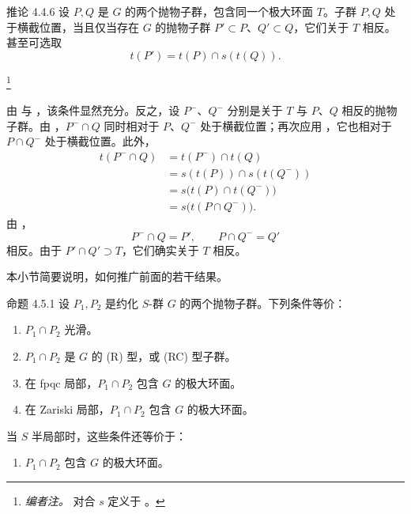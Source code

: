 \begin{sgastatement}{推论 4.4.6}
设 \(P,Q\) 是 \(G\) 的两个抛物子群，包含同一个极大环面 \(T\)。子群 \(P,Q\) 处于横截位置，当且仅当存在 \(G\) 的抛物子群 \(P'\subset P\)、\(Q'\subset Q\)，它们关于 \(T\) 相反。甚至可选取
\[
 t(P')=t(P)\cap s(t(Q)).
\]
\end{sgastatement}
\footnote{\emph{编者注。} 对合 \(s\) 定义于 。}

由 \textup{} 与 \textup{}，该条件显然充分。反之，设 \(P^-\)、\(Q^-\) 分别是关于 \(T\) 与 \(P\)、\(Q\) 相反的抛物子群。由 ，\(P^-\cap Q\) 同时相对于 \(P\)、\(Q^-\) 处于横截位置；再次应用 ，它也相对于 \(P\cap Q^-\) 处于横截位置。此外，
\[
\begin{aligned}
 t(P^-\cap Q)
 &=t(P^-)\cap t(Q)\\
 &=s(t(P))\cap s(t(Q^-))\\
 &=s\bigl(t(P)\cap t(Q^-)\bigr)\\
 &=s\bigl(t(P\cap Q^-)\bigr).
\end{aligned}
\]
由 \textup{}，
\[
 P^-\cap Q=P',\qquad P\cap Q^-=Q'
\]
相反。由于 \(P'\cap Q'\supset T\)，它们确实关于 \(T\) 相反。

本小节简要说明，如何推广前面的若干结果。

\begin{sgastatement}{命题 4.5.1}
设 \(P_1,P_2\) 是约化 \(S\)-群 \(G\) 的两个抛物子群。下列条件等价：
\begin{enumerate}[label=\textup{(\roman*)}]
\item \(P_1\cap P_2\) 光滑。
\item \(P_1\cap P_2\) 是 \(G\) 的 \textup{(R)} 型，或 \textup{(RC)} 型子群。
\item 在 fpqc 局部，\(P_1\cap P_2\) 包含 \(G\) 的极大环面。
\item 在 Zariski 局部，\(P_1\cap P_2\) 包含 \(G\) 的极大环面。
\end{enumerate}
当 \(S\) 半局部时，这些条件还等价于：
\begin{enumerate}[label=\textup{(\roman*)},start=5]
\item \(P_1\cap P_2\) 包含 \(G\) 的极大环面。
\end{enumerate}
\end{sgastatement}

